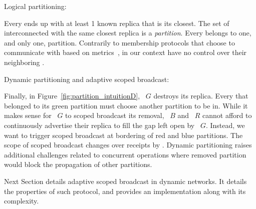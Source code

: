 \begin{asparadesc}
\item [Logical partitioning:]

Every \process ends up with at least 1 known replica that is its
closest. The set of interconnected \processes with the same closest
replica is a \emph{partition}. Every \process belongs to one, and only
one, partition. Contrarily to membership protocols that choose
\processes to communicate with based on metrics~\REF, \processes in
our context have no control over their neighboring \processes.

\item [Dynamic partitioning and adaptive scoped broadcast:]

Finally, in Figure~\ref{fig:partition_intuitionD}, \Process~$G$
destroys its replica. Every \processes that belonged to its green
partition must choose another partition to be in. While it makes sense
for \Process~$G$ to scoped broadcast its removal, \Process~$B$ and
\Process~$R$ cannot afford to continuously advertise their replica to
fill the gap left open by \Process~$G$. Instead, we want to trigger
scoped broadcast at bordering \processes of red and blue
partitions. The scope of scoped broadcast changes over receipts by
\processes. Dynamic partitioning raises additional challenges related
to concurrent operations where removed partition would block the
propagation of other partitions.
\end{asparadesc}

Next Section details adaptive scoped broadcast in dynamic networks. It
details the properties of such protocol, and provides an
implementation along with its complexity.


